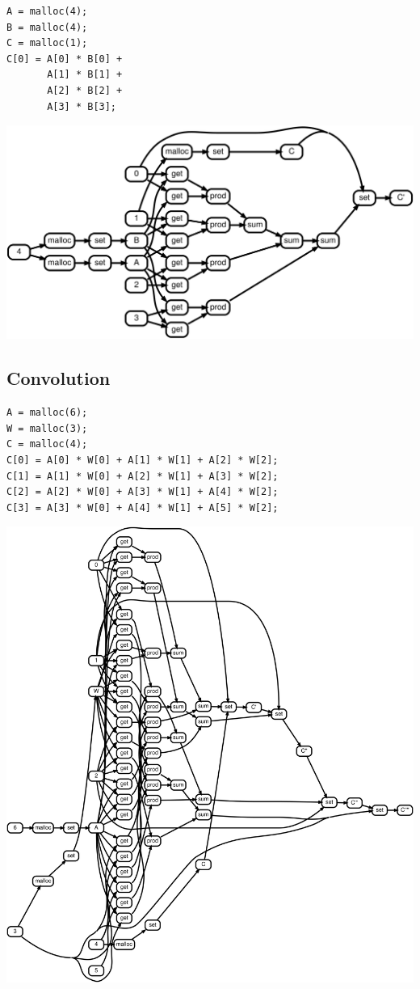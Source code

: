 \documentclass[11pt]{article}
\begin{document}
\begin{lstlisting}
A = malloc(4);
B = malloc(4);
C = malloc(1);
C[0] = A[0] * B[0] +
       A[1] * B[1] +
       A[2] * B[2] +
       A[3] * B[3];
\end{lstlisting}

\includegraphics[scale=0.25]{rtd33}

\pagebreak\subsection{Convolution}

\begin{lstlisting}
A = malloc(6);
W = malloc(3);
C = malloc(4);
C[0] = A[0] * W[0] + A[1] * W[1] + A[2] * W[2];
C[1] = A[1] * W[0] + A[2] * W[1] + A[3] * W[2];
C[2] = A[2] * W[0] + A[3] * W[1] + A[4] * W[2];
C[3] = A[3] * W[0] + A[4] * W[1] + A[5] * W[2];
\end{lstlisting}

    \includegraphics[scale=0.25]{rtd34}
\end{document}
